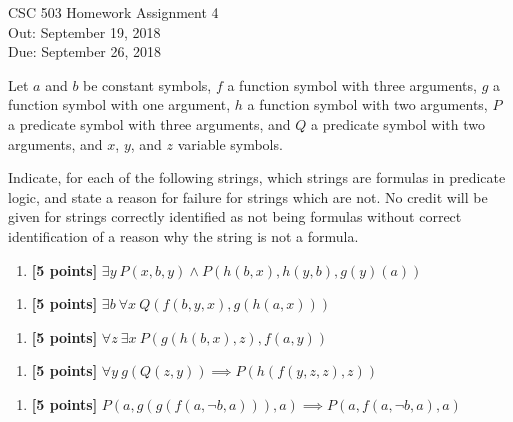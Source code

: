 \documentclass{article}
\begin{document}
\begin{center}
  {\LARGE CSC 503 Homework Assignment 4}\\[1pc]
  Out: September 19, 2018 \\
  Due: September 26, 2018 \\
\end{center}




\noindent
 Let $a$ and $b$ be constant symbols,
  $f$ a function symbol with three arguments,
  $g$ a function symbol with one argument,
  $h$ a function symbol with two arguments,
  $P$ a predicate symbol with three arguments, and
  $Q$ a predicate symbol with two arguments, and
  $x$, $y$, and $z$ variable symbols.

Indicate, for each of the following strings, which strings are
formulas in predicate logic, and state a reason for failure for
strings which are not.  No credit will be given for strings correctly
identified as not being formulas without correct identification of a
reason why the string is not a formula.

\begin{enumerate}
\item[1.] \textbf{[5 points]} 
    $\exists y\ P(x,b,y) \land P(h(b,x),h(y,b),g(y)(a))$
\end{enumerate}

\begin{enumerate}
\item[2.] \textbf{[5 points]}
  $\exists b\ \forall x\ Q(f(b,y,x),g(h(a,x)))$
\end{enumerate}

\begin{enumerate}
\item[3.] \textbf{[5 points]}
    $\forall z\ \exists x\ P(g(h(b,x),z),f(a,y))$
\end{enumerate}

\begin{enumerate}
\item[4.] \textbf{[5 points]}
  $\forall y\ g(Q(z,y)) \implies P(h(f(y,z,z),z))$
\end{enumerate}

\begin{enumerate}
\item[5.] \textbf{[5 points]}
  $P(a,g(g(f(a,\neg b, a))),a) \implies P(a,f(a,\neg b, a),a)$
\end{enumerate}
\end{document}
